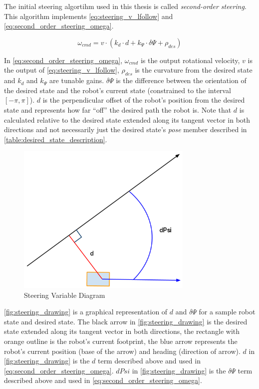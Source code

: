 The initial steering algortihm used in this thesis is called \emph{second-order steering}. This algorithm implements \eqref{eq:steering_v_lfollow} and \eqref{eq:second_order_steering_omega}.

\begin{equation}
\omega_{cmd} = v \cdot \left(k_d \cdot d + k_{\Psi} \cdot \delta\Psi + \rho_{des}\right)
\label{eq:second_order_steering_omega}
\end{equation}

In \eqref{eq:second_order_steering_omega}, $\omega_{cmd}$ is the output rotational velocity, $v$ is the output of \eqref{eq:steering_v_lfollow}, $\rho_{des}$ is the curvature from the desired state and $k_d$ and $k_{\Psi}$ are tunable gains. $\delta\Psi$ is the difference between the orientation of the desired state and the robot's current state (constrained to the interval $\left[-\pi,\pi\right]$). $d$ is the perpendicular offset of the robot's position from the desired state and represents how far ``off'' the desired path the robot is. Note that $d$ is calculated relative to the desired state extended along its tangent vector in both directions and not necessarily just the desired state's \emph{pose} member described in \autoref{table:desired_state_description}. 

\begin{figure}
\centering
\includegraphics[width=0.75\textwidth]{images/steering_drawing}
\caption{Steering Variable Diagram \label{fig:steering_drawing}}
\end{figure}

\autoref{fig:steering_drawing} is a graphical representation of $d$ and $\delta\Psi$ for a sample robot state and desired state. The black arrow in \autoref{fig:steering_drawing} is the desired state extended along its tangent vector in both directions, the rectangle with orange outline is the robot's current footprint, the blue arrow represents the robot's current position (base of the arrow) and heading (direction of arrow). $d$ in \autoref{fig:steering_drawing} is the $d$ term described above and used in \eqref{eq:second_order_steering_omega}. $dPsi$ in \autoref{fig:steering_drawing} is the $\delta\Psi$ term described above and used in \eqref{eq:second_order_steering_omega}.

